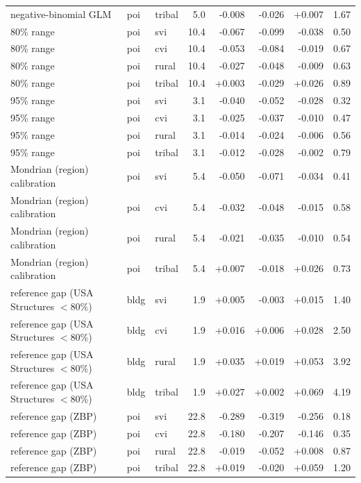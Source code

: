 {\begin{longtable}{lllrrrrr}
negative-binomial GLM & poi & tribal & 5.0 & -0.008 & -0.026 & +0.007 & 1.67 \\
80\% range & poi & svi & 10.4 & -0.067 & -0.099 & -0.038 & 0.50 \\
80\% range & poi & cvi & 10.4 & -0.053 & -0.084 & -0.019 & 0.67 \\
80\% range & poi & rural & 10.4 & -0.027 & -0.048 & -0.009 & 0.63 \\
80\% range & poi & tribal & 10.4 & +0.003 & -0.029 & +0.026 & 0.89 \\
95\% range & poi & svi & 3.1 & -0.040 & -0.052 & -0.028 & 0.32 \\
95\% range & poi & cvi & 3.1 & -0.025 & -0.037 & -0.010 & 0.47 \\
95\% range & poi & rural & 3.1 & -0.014 & -0.024 & -0.006 & 0.56 \\
95\% range & poi & tribal & 3.1 & -0.012 & -0.028 & -0.002 & 0.79 \\
Mondrian (region) calibration & poi & svi & 5.4 & -0.050 & -0.071 & -0.034 & 0.41 \\
Mondrian (region) calibration & poi & cvi & 5.4 & -0.032 & -0.048 & -0.015 & 0.58 \\
Mondrian (region) calibration & poi & rural & 5.4 & -0.021 & -0.035 & -0.010 & 0.54 \\
Mondrian (region) calibration & poi & tribal & 5.4 & +0.007 & -0.018 & +0.026 & 0.73 \\
reference gap (USA Structures $<$80\%) & bldg & svi & 1.9 & +0.005 & -0.003 & +0.015 & 1.40 \\
reference gap (USA Structures $<$80\%) & bldg & cvi & 1.9 & +0.016 & +0.006 & +0.028 & 2.50 \\
reference gap (USA Structures $<$80\%) & bldg & rural & 1.9 & +0.035 & +0.019 & +0.053 & 3.92 \\
reference gap (USA Structures $<$80\%) & bldg & tribal & 1.9 & +0.027 & +0.002 & +0.069 & 4.19 \\
reference gap (ZBP) & poi & svi & 22.8 & -0.289 & -0.319 & -0.256 & 0.18 \\
reference gap (ZBP) & poi & cvi & 22.8 & -0.180 & -0.207 & -0.146 & 0.35 \\
reference gap (ZBP) & poi & rural & 22.8 & -0.019 & -0.052 & +0.008 & 0.87 \\
reference gap (ZBP) & poi & tribal & 22.8 & +0.019 & -0.020 & +0.059 & 1.20 \\
\bottomrule
\end{longtable}
}